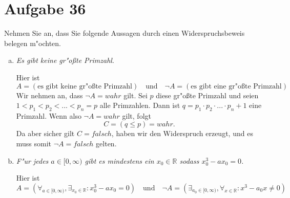\section{Aufgabe 36}
\setcounter{section}{36}

Nehmen Sie an, dass Sie folgende Aussagen durch einen Widerspruchsbeweis
belegen m"ochten.
\begin{enumerate}[a)]
    \item \textit{Es gibt keine gr"o{\ss}te Primzahl}.

        Hier ist
        \begin{equation*}
            A = (\text{es gibt keine gr"o{\ss}te Primzahl})
            \quad\text{und}\quad
            \lnot A = (\text{es gibt eine gr"o{\ss}te Primzahl})
        \end{equation*}
        Wir nehmen an, dass $\lnot A = wahr$ gilt. Sei $p$ diese gr"o{\ss}te
        Primzahl und seien $1 < p_1 < p_2 < ... < p_n = p$ alle Primzahlen.
        Dann ist $q = p_1 \cdot p_2 \cdot ... \cdot p_n + 1$ eine Primzahl.
        Wenn also $\lnot A = wahr$ gilt, folgt
        \begin{equation*}
            C = (q \leq p) = wahr.
        \end{equation*}
        Da aber sicher gilt $C = falsch$, haben wir den Widerspruch erzeugt,
        und es muss somit $\lnot A = falsch$ gelten.
    \item \textit{F"ur jedes $a \in [0, \infty)$ gibt es mindestens ein $x_0 \in \mathbb{R}$ sodass $x_0^3 - ax_0 = 0$.}

        Hier ist
        \begin{equation*}
            A = (\forall_{a \in [0, \infty)}, \exists_{x_0 \in \mathbb{R}} : x_0^3 - ax_0 = 0)
            \quad\text{und}\quad
            \lnot A = (\exists_{a_0 \in [0, \infty)}, \forall_{x \in \mathbb{R}} : x^3 - a_0x \neq 0)
        \end{equation*}


\end{enumerate}
